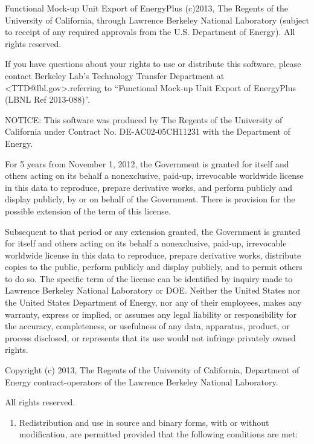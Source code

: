 Functional Mock-up Unit Export of EnergyPlus (c)2013, The Regents of the University of California, through Lawrence Berkeley National Laboratory (subject to receipt of any required approvals from the U.S. Department of Energy). All rights reserved.

If you have questions about your rights to use or distribute this software, please contact Berkeley Lab's Technology Transfer Department at \textless{}TTD@lbl.gov\textgreater{}.referring to ``Functional Mock-up Unit Export of EnergyPlus (LBNL Ref 2013-088)''.

NOTICE: This software was produced by The Regents of the University of California under Contract No. DE-AC02-05CH11231 with the Department of Energy.

For 5 years from November 1, 2012, the Government is granted for itself and others acting on its behalf a nonexclusive, paid-up, irrevocable worldwide license in this data to reproduce, prepare derivative works, and perform publicly and display publicly, by or on behalf of the Government. There is provision for the possible extension of the term of this license.

Subsequent to that period or any extension granted, the Government is granted for itself and others acting on its behalf a nonexclusive, paid-up, irrevocable worldwide license in this data to reproduce, prepare derivative works, distribute copies to the public, perform publicly and display publicly, and to permit others to do so. The specific term of the license can be identified by inquiry made to Lawrence Berkeley National Laboratory or DOE. Neither the United States nor the United States Department of Energy, nor any of their employees, makes any warranty, express or implied, or assumes any legal liability or responsibility for the accuracy, completeness, or usefulness of any data, apparatus, product, or process disclosed, or represents that its use would not infringe privately owned rights.

Copyright (c) 2013, The Regents of the University of California, Department of Energy contract-operators of the Lawrence Berkeley National Laboratory.

All rights reserved.

\begin{enumerate}
\def\labelenumi{\arabic{enumi}.}
\tightlist
\item
  Redistribution and use in source and binary forms, with or without modification, are permitted provided that the following conditions are met: 
\end{enumerate}


